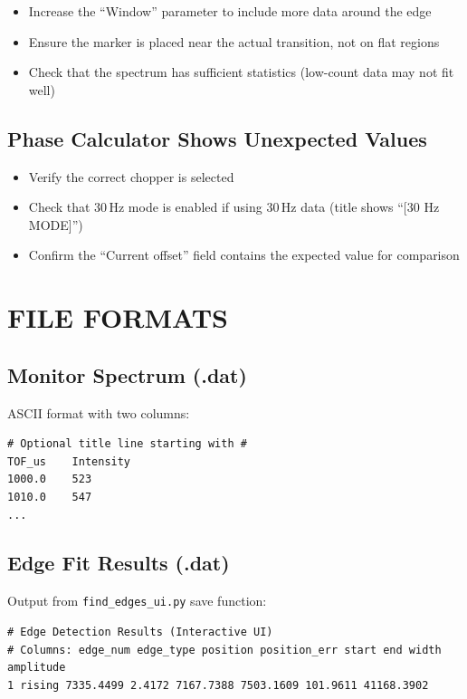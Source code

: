 \documentclass[tm]{ornltm}
\begin{document}
\begin{itemize}
    \item Increase the ``Window'' parameter to include more data around the edge
    \item Ensure the marker is placed near the actual transition, not on flat regions
    \item Check that the spectrum has sufficient statistics (low-count data may not fit well)
\end{itemize}

\subsection{Phase Calculator Shows Unexpected Values}

\begin{itemize}
    \item Verify the correct chopper is selected
    \item Check that 30\,Hz mode is enabled if using 30\,Hz data (title shows ``[30 Hz MODE]'')
    \item Confirm the ``Current offset'' field contains the expected value for comparison
\end{itemize}

\section{FILE FORMATS}

\subsection{Monitor Spectrum (.dat)}

ASCII format with two columns:
\begin{lstlisting}
# Optional title line starting with #
TOF_us    Intensity
1000.0    523
1010.0    547
...
\end{lstlisting}

\subsection{Edge Fit Results (.dat)}

Output from \texttt{find\_edges\_ui.py} save function:
\begin{lstlisting}
# Edge Detection Results (Interactive UI)
# Columns: edge_num edge_type position position_err start end width amplitude
1 rising 7335.4499 2.4172 7167.7388 7503.1609 101.9611 41168.3902
\end{lstlisting}
\end{document}
